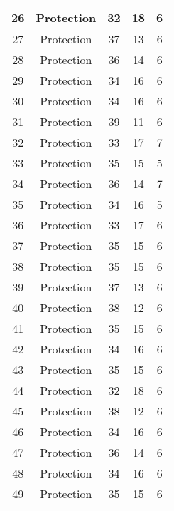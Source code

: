 \documentclass[results.tex]{subfiles}
\begin{document}
\begin{center}
\begin{tabular}{| c || c | c | c | c |}
    \hline
    26 & Protection & 32 & 18 & 6 \\ 
    \hline
    27 & Protection & 37 & 13 & 6 \\ 
    \hline
    28 & Protection & 36 & 14 & 6 \\ 
    \hline
    29 & Protection & 34 & 16 & 6 \\ 
    \hline
    30 & Protection & 34 & 16 & 6 \\ 
    \hline
    31 & Protection & 39 & 11 & 6 \\ 
    \hline
    32 & Protection & 33 & 17 & 7 \\ 
    \hline
    33 & Protection & 35 & 15 & 5 \\ 
    \hline
    34 & Protection & 36 & 14 & 7 \\ 
    \hline
    35 & Protection & 34 & 16 & 5 \\ 
    \hline
    36 & Protection & 33 & 17 & 6 \\ 
    \hline
    37 & Protection & 35 & 15 & 6 \\ 
    \hline
    38 & Protection & 35 & 15 & 6 \\ 
    \hline
    39 & Protection & 37 & 13 & 6 \\ 
    \hline
    40 & Protection & 38 & 12 & 6 \\ 
    \hline
    41 & Protection & 35 & 15 & 6 \\ 
    \hline
    42 & Protection & 34 & 16 & 6 \\ 
    \hline
    43 & Protection & 35 & 15 & 6 \\ 
    \hline
    44 & Protection & 32 & 18 & 6 \\ 
    \hline
    45 & Protection & 38 & 12 & 6 \\ 
    \hline
    46 & Protection & 34 & 16 & 6 \\ 
    \hline
    47 & Protection & 36 & 14 & 6 \\ 
    \hline
    48 & Protection & 34 & 16 & 6 \\ 
    \hline
    49 & Protection & 35 & 15 & 6 \\ 
    \hline   \end{tabular}
\end{center}
\end{document}

